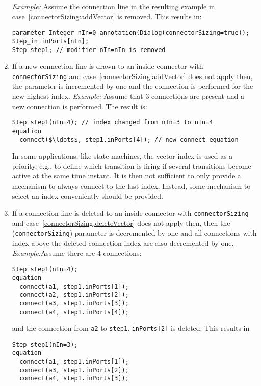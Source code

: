 \begin{nonnormative}
\begin{enumerate}
  \emph{Example:} Assume the connection line in the resulting example in case~\ref{connectorSizing:addVector} is removed.
  This results in:
\begin{lstlisting}[language=modelica]
parameter Integer nIn=0 annotation(Dialog(connectorSizing=true));
Step_in inPorts[nIn];
Step step1; // modifier nIn=nIn is removed
\end{lstlisting}
\item \label{connectorSizing:addScalar}
  If a new connection line is drawn to an inside connector with
  \lstinline!connectorSizing! and case~\ref{connectorSizing:addVector} does not apply then, the parameter is
  incremented by one and the connection is performed for the new highest
  index. \emph{Example:} Assume that 3 connections are present and a new
  connection is performed. The result is:
\begin{lstlisting}[language=modelica]
  Step step1(nIn=4); // index changed from nIn=3 to nIn=4
equation
  connect($\ldots$, step1.inPorts[4]); // new connect-equation
\end{lstlisting}
  In some applications, like state machines, the vector index is
  used as a priority, e.g., to define which transition is firing if
  several transitions become active at the same time instant. It is then
  not sufficient to only provide a mechanism to always connect to the
  last index. Instead, some mechanism to select an index conveniently
  should be provided.
\item \label{connectorSizing:deleteScalar}
  If a connection line is deleted to an inside connector with
  \lstinline!connectorSizing! and case~\ref{connectorSizing:deleteVector} does not apply then, then the
  (\lstinline!connectorSizing!) parameter is decremented by one and all connections
  with index above the deleted connection index are also decremented by
  one. \emph{Example:}Assume there are 4 connections:
\begin{lstlisting}[language=modelica]
  Step step1(nIn=4);
equation
  connect(a1, step1.inPorts[1]);
  connect(a2, step1.inPorts[2]);
  connect(a3, step1.inPorts[3]);
  connect(a4, step1.inPorts[4]);
\end{lstlisting}
  and the connection from \lstinline!a2! to \lstinline!step1!. \lstinline!inPorts[2]! is deleted.
  This results in
\begin{lstlisting}[language=modelica]
  Step step1(nIn=3);
equation
  connect(a1, step1.inPorts[1]);
  connect(a3, step1.inPorts[2]);
  connect(a4, step1.inPorts[3]);
\end{lstlisting}
\end{enumerate}


\end{nonnormative}
